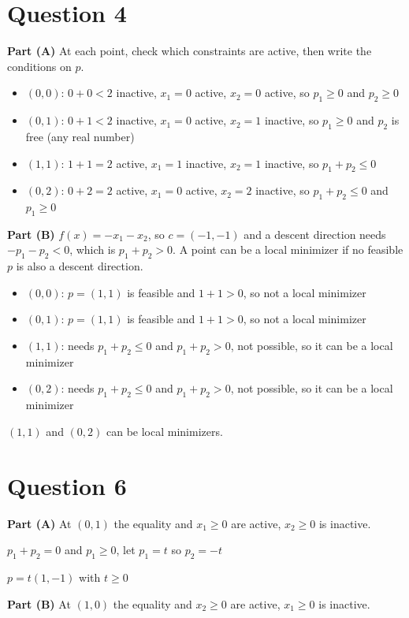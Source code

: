 \documentclass{article}
\begin{document}
\section*{Question 4}
\textbf{Part (A)} At each point, check which constraints are active, then write the conditions on $p$.
\begin{itemize}
    \item $(0,0)$: $0 + 0 < 2$ inactive, $x_1 = 0$ active, $x_2 = 0$ active, so $p_1 \ge 0$ and $p_2 \ge 0$
    \item $(0,1)$: $0 + 1 < 2$ inactive, $x_1 = 0$ active, $x_2 = 1$ inactive, so $p_1 \ge 0$ and $p_2$ is free (any real number)
    \item $(1,1)$: $1 + 1 = 2$ active, $x_1 = 1$ inactive, $x_2 = 1$ inactive, so $p_1 + p_2 \le 0$
    \item $(0,2)$: $0 + 2 = 2$ active, $x_1 = 0$ active, $x_2 = 2$ inactive, so $p_1 + p_2 \le 0$ and $p_1 \ge 0$
\end{itemize}

\textbf{Part (B)} $f(x) = -x_1 - x_2$, so $c = (-1,-1)$ and a descent direction needs $-p_1 - p_2 < 0$, which is $p_1 + p_2 > 0$. A point can be a local minimizer if no feasible $p$ is also a descent direction.
\begin{itemize}
    \item $(0,0)$: $p = (1,1)$ is feasible and $1 + 1 > 0$, so not a local minimizer
    \item $(0,1)$: $p = (1,1)$ is feasible and $1 + 1 > 0$, so not a local minimizer
    \item $(1,1)$: needs $p_1 + p_2 \le 0$ and $p_1 + p_2 > 0$, not possible, so it can be a local minimizer
    \item $(0,2)$: needs $p_1 + p_2 \le 0$ and $p_1 + p_2 > 0$, not possible, so it can be a local minimizer
\end{itemize}

$(1,1)$ and $(0,2)$ can be local minimizers.

\section*{Question 6}
\textbf{Part (A)} At $(0,1)$ the equality and $x_1 \ge 0$ are active, $x_2 \ge 0$ is inactive.

$p_1 + p_2 = 0$ and $p_1 \ge 0$, let $p_1 = t$ so $p_2 = -t$

$p = t(1,-1)$ with $t \ge 0$

\textbf{Part (B)} At $(1,0)$ the equality and $x_2 \ge 0$ are active, $x_1 \ge 0$ is inactive.
\end{document}
